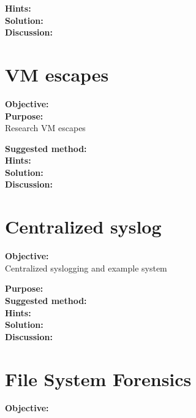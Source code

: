 \documentclass[a4paper,11pt,notitlepage]{report}
\begin{document}
{\bf Hints:}\\


{\bf Solution:}\\


{\bf Discussion:}\\




\chapter{VM escapes}
\label{ex:vm-escape}

{\bf Objective:}\\


{\bf Purpose:}\\
Research VM escapes

{\bf Suggested method:}\\


{\bf Hints:}\\


{\bf Solution:}\\


{\bf Discussion:}\\





\chapter{Centralized syslog}
\label{ex:centralized-syslog-practical}

{\bf Objective:}\\

Centralized syslogging and example system

{\bf Purpose:}\\


{\bf Suggested method:}\\


{\bf Hints:}\\


{\bf Solution:}\\


{\bf Discussion:}\\


\chapter{File System Forensics}
\label{ex:file-system-forensics}

{\bf Objective:}\\
\end{document}
